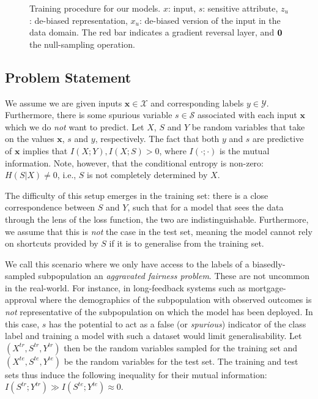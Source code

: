 \begin{figure}[tb]
{        \label{fig:cvae_diagram}
    }
    \hfill
    \caption{
        Training procedure for our models. $x$: input, $s$: sensitive attribute, $z_u$: de-biased representation, $x_u$: de-biased version of the input in the data domain.
        The red bar indicates a gradient reversal layer, and ${\bm{0}}$ the null-sampling operation.
    }%
    \label{fig:model-diagrams}
\end{figure}

\subsection{Problem Statement} %
\noindent We assume we are given inputs $\bm{x} \in \mathcal{X}$ and corresponding labels $y \in \mathcal{Y}$.
Furthermore, there is some spurious variable $s \in \mathcal{S}$ associated with each input $\bm{x}$ which we do \emph{not} want to predict. 
Let $X$, $S$ and $Y$ be random variables that take on the values $\bm{x}$, $s$ and $y$, respectively.
The fact that both $y$ and $s$ are predictive of $\bm{x}$ implies that $I(X;Y), I(X;S) > 0$, where $I(\cdot ;\cdot)$ is the mutual information.
Note, however, that the conditional entropy is non-zero: $H(S|X) \neq 0$, i.e., $S$ is not completely determined by $X$.

The difficulty of this setup emerges in the training set: there is a close correspondence between $S$ and $Y$, such that for a model that sees the data through the lens of the loss function, the two are indistinguishable.
Furthermore, we assume that this is \emph{not} the case in the test set, meaning the model cannot rely on shortcuts provided by $S$ if it is to generalise from the training set.

We call this scenario where we only have access to the labels of a biasedly-sampled subpopulation
an \emph{aggravated fairness problem}.
These are not uncommon in the real-world.
For instance, in long-feedback systems such as mortgage-approval where the demographics of the subpopulation with observed outcomes is \emph{not} representative of the subpopulation on which the model has been deployed. 
In this case, $s$ has the potential to act as a false (or \emph{spurious}) indicator of the class label and
training a model with such a dataset would limit generalisability.
Let $(X^\mathit{tr}, S^\mathit{tr}, Y^\mathit{tr})$ then be the random variables sampled for the training set
and $(X^\mathit{te}, S^\mathit{te}, Y^\mathit{te})$ be the random variables for the test set.
The training and test sets thus induce the following inequality for their mutual information:
$I(S^\mathit{tr}; Y^\mathit{tr}) \gg I(S^\mathit{te}; Y^\mathit{te}) \approx 0$.

